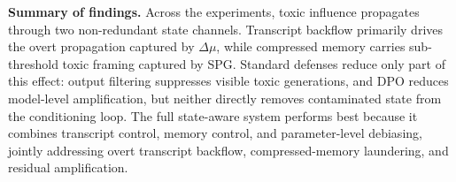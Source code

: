  


\noindent \textbf{Summary of findings.}
Across the experiments, toxic influence propagates through two non-redundant state channels. Transcript backflow primarily drives the overt propagation captured by $\Delta\mu$, while compressed memory carries sub-threshold toxic framing captured by SPG. Standard defenses reduce only part of this effect: output filtering suppresses visible toxic generations, and DPO reduces model-level amplification, but neither directly removes contaminated state from the conditioning loop. The full state-aware system performs best because it combines transcript control, memory control, and parameter-level debiasing, jointly addressing overt transcript backflow, compressed-memory laundering, and residual amplification.

